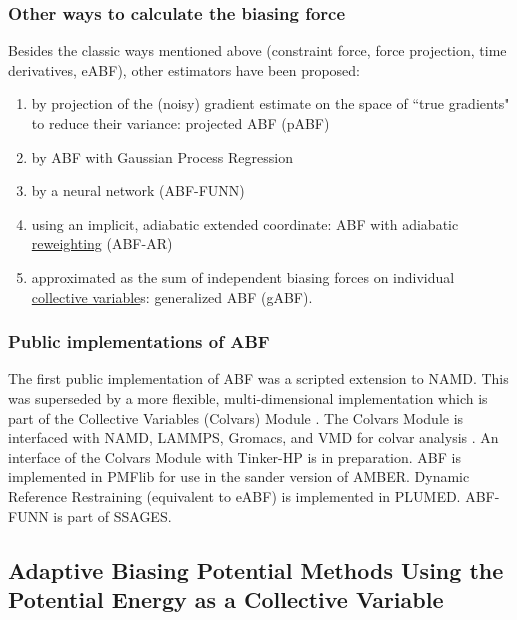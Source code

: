 \documentclass[9pt,review]{livecoms}
\begin{document}
\subsubsection{Other ways to calculate the biasing force}
\label{sec:ABF_variants}

Besides the classic ways mentioned above (constraint force, force projection, time derivatives, eABF), other estimators have been proposed:
\begin{enumerate}
\item by projection of the (noisy) gradient estimate on the space of ``true gradients" to reduce their variance: projected ABF (pABF)\cite{lelievre-rousset-stoltz-07-a,Alrachid2015}
\item by ABF with Gaussian Process Regression\cite{Mones2016}
\item by a neural network (ABF-FUNN)\cite{Guo2018}
\item using an implicit, adiabatic extended coordinate: ABF with adiabatic \hyperlink{ref:Reweighting} {reweighting} (ABF-AR)\cite{Cao2014}
\item approximated as the sum of independent biasing forces on individual \hyperlink{ref:CV} {collective variable}s: generalized ABF (gABF)\cite{Chipot2011, Zhao2017}.
\end{enumerate}


\subsubsection{Public implementations of ABF}

The first public implementation of ABF\cite{Henin2004} was a scripted extension to NAMD.\cite{Phillips2020}
This was superseded by a more flexible, multi-dimensional implementation\cite{Henin2010a} which is part of the Collective Variables (Colvars) Module \cite{Fiorin2013}.
The Colvars Module is interfaced with NAMD\cite{Phillips2020}, LAMMPS\cite{Plimpton1995}, Gromacs\cite{Abraham2015}, and VMD\cite{Humphrey1996} for colvar analysis \cite{Henin2022dashboard}.
An interface of the Colvars Module with Tinker-HP\cite{Lagardere2018} is in preparation.
ABF is implemented in PMFlib\cite{kulhanek2011pmflib} for use in the sander version of AMBER.
Dynamic Reference Restraining\cite{Zheng2012} (equivalent to eABF) is implemented in PLUMED.\cite{Tribello2014}
ABF-FUNN is part of SSAGES.\cite{Sidky2018}


\subsection{Adaptive Biasing Potential Methods Using the Potential Energy as a Collective Variable}
\label{sec:abp_energy}
\end{document}
